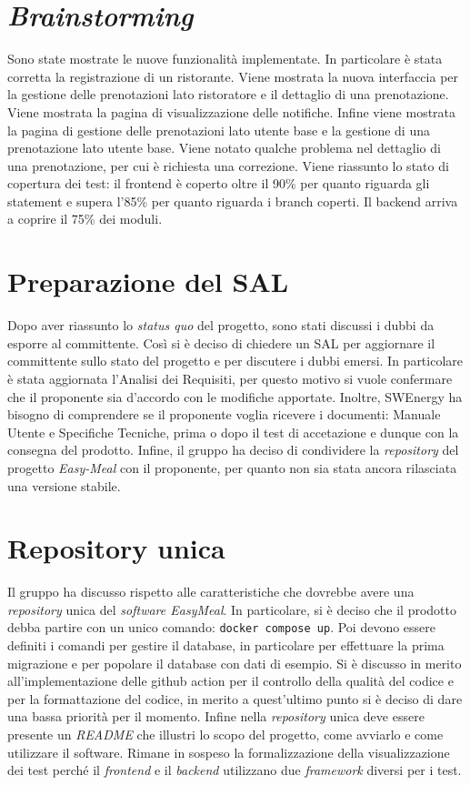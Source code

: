 \section{\textit{Brainstorming}}

Sono state mostrate le nuove funzionalità implementate. In particolare è stata
corretta la registrazione di un ristorante. Viene mostrata la nuova interfaccia
per la gestione delle prenotazioni lato ristoratore e il dettaglio di una
prenotazione. Viene mostrata la pagina di visualizzazione delle notifiche.
Infine viene mostrata la pagina di gestione delle prenotazioni lato utente base
e la gestione di una prenotazione lato utente base. Viene notato qualche
problema nel dettaglio di una prenotazione, per cui è richiesta una correzione.
Viene riassunto lo stato di copertura dei test: il frontend è coperto oltre il
90\% per quanto riguarda gli statement e supera l'85\% per quanto riguarda i
branch coperti. Il backend arriva a coprire il 75\% dei moduli.

\section{Preparazione del SAL}

Dopo aver riassunto lo \textit{status quo} del progetto, sono stati discussi i
dubbi da esporre al committente. Così si è deciso di chiedere un SAL per
aggiornare il committente sullo stato del progetto e per discutere i dubbi
emersi. In particolare è stata aggiornata l'Analisi dei Requisiti, per questo
motivo si vuole confermare che il proponente sia d'accordo con le modifiche
apportate. Inoltre, SWEnergy ha bisogno di comprendere se il proponente voglia
ricevere i documenti: Manuale Utente e Specifiche Tecniche, prima o dopo il test
di accetazione e dunque con la consegna del prodotto. Infine, il gruppo ha
deciso di condividere la \textit{repository} del progetto \textit{Easy-Meal} con
il proponente, per quanto non sia stata ancora rilasciata una versione stabile.

\section{Repository unica}

Il gruppo ha discusso rispetto alle caratteristiche che dovrebbe avere una
\textit{repository} unica del \textit{software EasyMeal}. In particolare, si è 
deciso che il prodotto debba partire con un unico comando: 
\texttt{docker compose up}. Poi devono essere definiti i comandi per gestire il
database, in particolare per effettuare la prima migrazione e per popolare il
database con dati di esempio. Si è discusso in merito all'implementazione delle
github action per il controllo della qualità del codice e per la formattazione
del codice, in merito a quest'ultimo punto si è deciso di dare una bassa
priorità per il momento. Infine nella \textit{repository} unica deve essere
presente un \textit{README} che illustri lo scopo del progetto, come avviarlo e
come utilizzare il software. Rimane in sospeso la formalizzazione della
visualizzazione dei test perché il \textit{frontend} e il \textit{backend} 
utilizzano due \textit{framework} diversi per i test.

